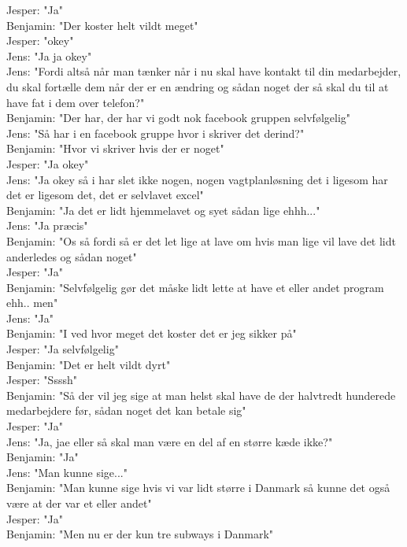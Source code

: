 Jesper: "Ja"\\
Benjamin: "Der koster helt vildt meget"\\
Jesper: "okey"\\
Jens: "Ja ja okey"\\
Jens: "Fordi altså når man tænker når i nu skal have kontakt til din medarbejder, du skal fortælle dem når der er en ændring og sådan noget der så skal du til at have fat i dem over telefon?"\\
Benjamin: "Der har, der har vi godt nok facebook gruppen selvfølgelig"\\
Jens: "Så har i en facebook gruppe hvor i skriver det derind?"\\
Benjamin: "Hvor vi skriver hvis der er noget"\\
Jesper: "Ja okey"\\
Jens: "Ja okey så i har slet ikke nogen, nogen vagtplanløsning det i ligesom har det er ligesom det, det er selvlavet excel"\\
Benjamin: "Ja det er lidt hjemmelavet og syet sådan lige ehhh..."\\
Jens: "Ja præcis"\\
Benjamin: "Os så fordi så er det let lige at lave om hvis man lige vil lave det lidt anderledes og sådan noget"\\
Jesper: "Ja"\\
Benjamin: "Selvfølgelig gør det måske lidt lette at have et eller andet program ehh.. men"\\
Jens: "Ja"\\
Benjamin: "I ved hvor meget det koster det er jeg sikker på"\\
Jesper: "Ja selvfølgelig"\\
Benjamin: "Det er helt vildt dyrt"\\
Jesper: "Ssssh"\\
Benjamin: "Så der vil jeg sige at man helst skal have de der halvtredt hunderede medarbejdere før, sådan noget det kan betale sig"\\
Jesper: "Ja"\\
Jens: "Ja, jae eller så skal man være en del af en større kæde ikke?"\\
Benjamin: "Ja"\\
Jens: "Man kunne sige..."\\
Benjamin: "Man kunne sige hvis vi var lidt større i Danmark så kunne det også være at der var et eller andet"\\
Jesper: "Ja"\\
Benjamin: "Men nu er der kun tre subways i Danmark"\\
